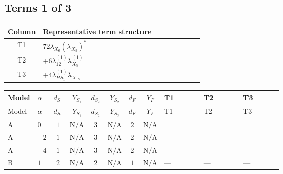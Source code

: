 \documentclass[8pt]{article}
\begin{document}
\begin{landscape}
\subsection*{Terms 1 of 3}
\begin{center}
\begin{tabular}{@{}c >{\raggedright\arraybackslash}p{0.82\linewidth}@{}}
\toprule
Column & Representative term structure \\
\midrule
T1 & \(\displaystyle 72 {\lambda_{X_{6}}} \left({\lambda_{X_{9}}}\right)^{*}\) \\
\midrule
T2 & \(\displaystyle +6 {\lambda_{12}^{(1)}} {\lambda_{X_{5}}^{(1)}}\) \\
\midrule
T3 & \(\displaystyle +4 {\lambda_{HS_1}^{(1)}} {\lambda_{X_{18}}}\) \\
\midrule
\bottomrule
\end{tabular}
\end{center}
\smallskip
\tiny
\begin{longtable}{@{}llcccccc >{\raggedright\arraybackslash}p{0.21\linewidth} >{\raggedright\arraybackslash}p{0.21\linewidth} >{\raggedright\arraybackslash}p{0.21\linewidth}@{}}
\toprule
Model & $\alpha$ & $d_{S_1}$ & $Y_{S_1}$ & $d_{S_2}$ & $Y_{S_2}$ & $d_F$ & $Y_F$ & T1 & T2 & T3 \\
\midrule
\endfirsthead
\toprule
Model & $\alpha$ & $d_{S_1}$ & $Y_{S_1}$ & $d_{S_2}$ & $Y_{S_2}$ & $d_F$ & $Y_F$ & T1 & T2 & T3 \\
\midrule
\endhead
A & $0$ & $1$ & $\text{N/A}$ & $3$ & $\text{N/A}$ & $2$ & $\text{N/A}$ & \scriptsize\adjustbox{max width=\linewidth}{$\begin{gathered} 72 {\lambda_{X_{6}}} \left({\lambda_{X_{9}}}\right)^{*}\end{gathered}$} & \scriptsize\adjustbox{max width=\linewidth}{$\begin{gathered} +6 {\lambda_{12}^{(1)}} {\lambda_{X_{5}}^{(1)}}\end{gathered}$} & \scriptsize\adjustbox{max width=\linewidth}{$\begin{gathered} +4 {\lambda_{HS_1}^{(1)}} {\lambda_{X_{18}}}\end{gathered}$} \\
\midrule
A & $-2$ & $1$ & $\text{N/A}$ & $3$ & $\text{N/A}$ & $2$ & $\text{N/A}$ & --- & --- & --- \\
\midrule
A & $-4$ & $1$ & $\text{N/A}$ & $3$ & $\text{N/A}$ & $2$ & $\text{N/A}$ & --- & --- & --- \\
\midrule
B & $1$ & $2$ & $\text{N/A}$ & $2$ & $\text{N/A}$ & $1$ & $\text{N/A}$ & --- & --- & --- \\

\end{longtable}
\end{landscape}
\end{document}
